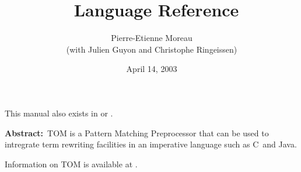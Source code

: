 \documentclass[a4paper]{book}
\title{\TOM\ Language Reference}
\author{Pierre-Etienne Moreau\\(with Julien Guyon and Christophe Ringeissen)}
\date{April 14, 2003}
\newcommand{\Clang}{\textsf{C}}
\newcommand{\Java}{\textsf{Java}}
\begin{document}
\maketitle

\begin{table}[h]
This manual also exists in   or .
\end{table}

\textbf{Abstract:}~TOM is a Pattern Matching Preprocessor that can be used to
intregrate term rewriting facilities in an imperative language such as
\Clang\ and \Java.

Information on TOM is available at .

\tableofcontents

%










\end{document}
